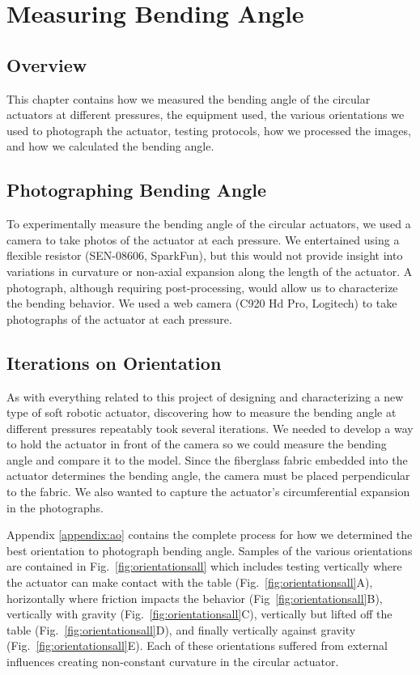 \chapter{Measuring Bending Angle}
\label{chapter:bendingangle}

\section*{Overview}
This chapter contains how we measured the bending angle of the circular actuators at different pressures, the equipment used, the various orientations we used to photograph the actuator, testing protocols, how we processed the images, and how we calculated the bending angle.

\section{Photographing Bending Angle}

To experimentally measure the bending angle of the circular actuators, we used a camera to take photos of the actuator at each pressure. We entertained using a flexible resistor (SEN-08606, SparkFun), but this would not provide insight into variations in curvature or non-axial expansion along the length of the actuator. A photograph, although requiring post-processing, would allow us to characterize the bending behavior. We used a web camera (C920 Hd Pro, Logitech) to take photographs of the actuator at each pressure.

\section{Iterations on Orientation}

As with everything related to this project of designing and characterizing a new type of soft robotic actuator, discovering how to measure the bending angle at different pressures repeatably took several iterations. We needed to develop a way to hold the actuator in front of the camera so we could measure the bending angle and compare it to the model. Since the fiberglass fabric embedded into the actuator determines the bending angle, the camera must be placed perpendicular to the fabric. We also wanted to capture the actuator's circumferential expansion in the photographs. 

Appendix \ref{appendix:ao} contains the complete process for how we determined the best orientation to photograph bending angle. Samples of the various orientations are contained in Fig.~\ref{fig:orientationsall} which includes testing vertically where the actuator can make contact with the table (Fig.~\ref{fig:orientationsall}A), horizontally where friction impacts the behavior (Fig~\ref{fig:orientationsall}B), vertically with gravity (Fig.~\ref{fig:orientationsall}C), vertically but lifted off the table (Fig.~\ref{fig:orientationsall}D), and finally vertically against gravity (Fig.~\ref{fig:orientationsall}E). Each of these orientations suffered from external influences creating non-constant curvature in the circular actuator. 


